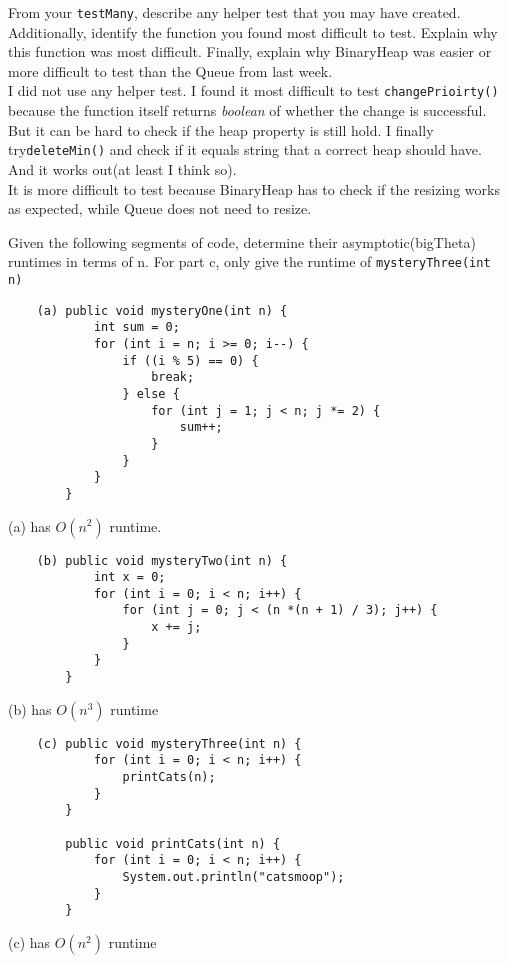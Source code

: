 \documentclass[]{exam}
\begin{document}
\begin{questions}
	\question From your \verb|testMany|, describe any helper test that you may have created. Additionally, identify the function you found most difficult to test. Explain why this function was most difficult. Finally, explain why BinaryHeap was easier or more difficult to test than the Queue from last week.
	\\ I did not use any helper test. I found it most difficult to test \verb|changePrioirty()| because the function itself returns \textit{boolean} of whether the change is successful. But it can be hard to check if the heap property is still hold. I finally try\verb|deleteMin()| and check if it equals string that a correct heap should have. And it works out(at least I think so).
	\\ It is more difficult to test because BinaryHeap has to check if the resizing works as expected, while Queue does not need to resize. 

	\question Given the following segments of code, determine their asymptotic(bigTheta) runtimes in terms of n. For part c, only give the runtime of \verb|mysteryThree(int n)|
	\begin{Verbatim}
	(a) public void mysteryOne(int n) {
			int sum = 0;
			for (int i = n; i >= 0; i--) {
				if ((i % 5) == 0) {
					break;
				} else {
					for (int j = 1; j < n; j *= 2) {
						sum++;
					}
				}
			}
		}
	\end{Verbatim}
	(a) has $O(n ^ 2)$ runtime.
	\begin{Verbatim}
	(b)	public void mysteryTwo(int n) { 
			int x = 0;
			for (int i = 0; i < n; i++) {
				for (int j = 0; j < (n *(n + 1) / 3); j++) {
					x += j;
				}
			}
		}
	\end{Verbatim}
	(b) has $O(n ^ 3)$ runtime
	\begin{Verbatim}
	(c) public void mysteryThree(int n) {
			for (int i = 0; i < n; i++) {
				printCats(n);
			}
		}

		public void printCats(int n) {
			for (int i = 0; i < n; i++) {
				System.out.println("catsmoop");
			}
		}
	\end{Verbatim}
	(c) has $O(n ^ 2)$ runtime
\end{questions}
\end{document}

